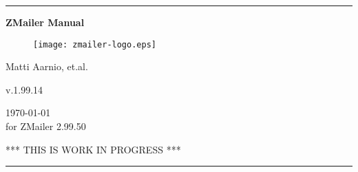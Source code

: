 \documentclass[twoside,twocolumn,a4paper,draft]{book}
\newcommand{\ZMailerManual}{ZMailer Manual}
\newcommand{\ZManVersion}{v.1.99.14}
\begin{document}
\startdocument

\begin{titlepage}
\rule{\textwidth}{1mm}
\begin{center}
\bf
\Huge
\vspace{2ex}
\ZMailerManual \\
\vspace{2ex}

\begin{htmlonly}
\end{htmlonly}

\begin{figure}[h]
  \texttt{[image: zmailer-logo.eps]}
\end{figure}
\vspace{2ex}

\Large
Matti Aarnio, et.al. \\
\vspace{2ex}
\begin{htmlonly}
\vspace{1ex}
\end{htmlonly}
\ZManVersion \\
\date \\
\today \\
for ZMailer 2.99.50 \\
\vspace{2ex}
\begin{htmlonly}
\vspace{1ex}
\end{htmlonly}
\Large
\sf
*** THIS IS WORK IN PROGRESS ***
\end{center}
\vfill
\rule{\textwidth}{1mm}
\end{titlepage}

\cleardoublepage


%
\end{document}
